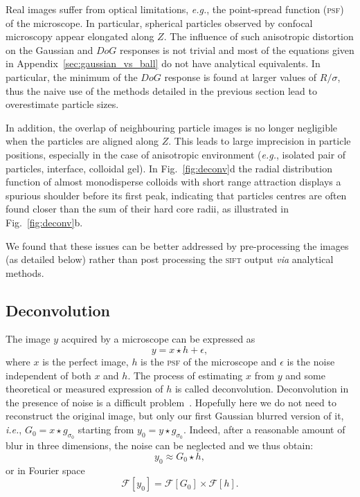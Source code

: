 \documentclass[8.5pt,twoside,twocolumn]{article}
\begin{document}
Real images suffer from optical limitations, \emph{e.g.}, the point-spread function (\textsc{psf}) of the microscope. In particular, spherical particles observed by confocal microscopy appear elongated along $Z$. The influence of such anisotropic distortion on the Gaussian and $DoG$ responses is not trivial and most of the equations given in Appendix~\ref{sec:gaussian_vs_ball} do not have analytical equivalents. In particular, the minimum of the $DoG$ response is found at larger values of $R/\sigma$, thus the naive use of the methods detailed in the previous section lead to overestimate particle sizes.

In addition, the overlap of neighbouring particle images is no longer negligible when the particles are aligned along $Z$. This leads to large imprecision in particle positions, especially in the case of anisotropic environment (\emph{e.g.}, isolated pair of particles, interface, colloidal gel). In Fig.~\ref{fig:deconv}d the radial distribution function of almost monodisperse colloids with short range attraction displays a spurious shoulder before its first peak, indicating that particles centres are often found closer than the sum of their hard core radii, as illustrated in Fig.~\ref{fig:deconv}b.

We found that these issues can be better addressed by pre-processing the images (as detailed below) rather than post processing the \textsc{sift} output \emph{via} analytical methods.

\subsection{Deconvolution}
The image $y$ acquired by a microscope can be expressed as 
\begin{equation}
y = x \star h + \epsilon,
\label{eq:psf}
\end{equation}
where $x$ is the perfect image, $h$ is the \textsc{psf} of the microscope and $\epsilon$ is the noise independent of both $x$ and $h$. The process of estimating $x$ from $y$ and some theoretical or measured expression of $h$ is called deconvolution. Deconvolution in the presence of noise is a difficult problem~\cite{Riad1986}. Hopefully here we do not need to reconstruct the original image, but only our first Gaussian blurred version of it, \emph{i.e.}, $G_0 = x \star g_{\sigma_0}$ starting from $y_0 = y \star g_{\sigma_0}$. Indeed, after a reasonable amount of blur in three dimensions, the noise can be neglected and we thus obtain:
\begin{equation}
y_0 \approx G_0 \star h,
\end{equation}
or in Fourier space
\begin{equation}
\mathcal{F}[y_0] = \mathcal{F}[G_0] \times \mathcal{F}[h]. 
\label{eq:Fourier_conv}
\end{equation}
\end{document}
